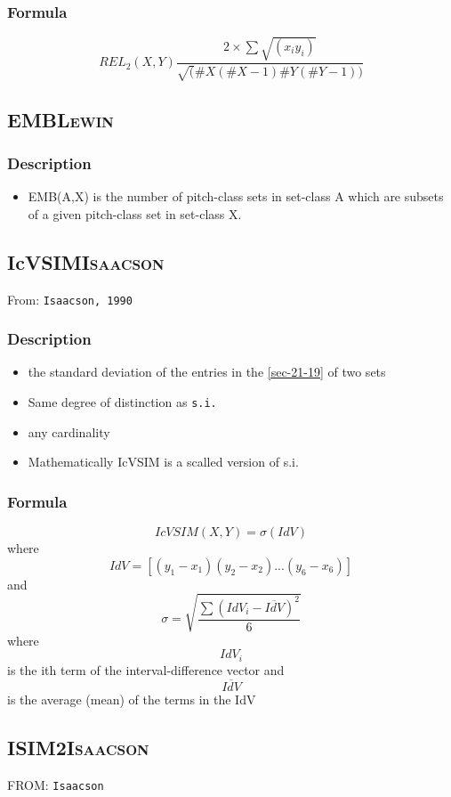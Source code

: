 \documentclass[11pt]{article}
\begin{document}
\subsubsection{Formula}
\label{sec-3-2-2}
$$ REL_{2}(X,Y) \frac{2\times \sum \sqrt{(x_{i}y_{i})}}{\sqrt(\#X(\#X-1)\#Y(\#Y-1))} $$

\subsection{EMB\hfill{}\textsc{Lewin}}
\label{sec-3-3}
\subsubsection{Description}
\label{sec-3-3-1}
\begin{itemize}
\item EMB(A,X) is the number of pitch-class sets in set-class A which
are subsets of a given pitch-class set in set-class X.
\end{itemize}
\subsection{IcVSIM\hfill{}\textsc{Isaacson}}
\label{sec-3-4}
From: \texttt{Isaacson, 1990}
\subsubsection{Description}
\label{sec-3-4-1}
\begin{itemize}
\item the standard deviation of the entries in the \ref{sec-21-19} of two sets
\item Same degree of distinction as \texttt{s.i.}
\item any cardinality
\item Mathematically IcVSIM is a scalled version of s.i.
\end{itemize}

\subsubsection{Formula}
\label{sec-3-4-2}
$$ IcVSIM\left(X,Y\right)=\sigma\left(IdV\right) $$
where 
$$ IdV=[(y_{1}-x_{1})(y_{2}-x_{2})...(y_{6}-x_{6})] $$
and
$$ \sigma =  \sqrt {\frac {\sum (IdV_{i}- \overline {IdV})^{2}}{6}} $$
where
$$IdV_{i}$$ is the ith term of the interval-difference vector and
$$\overline {IdV}$$ is the average (mean) of the terms in the IdV

\subsection{ISIM2\hfill{}\textsc{Isaacson}}
\label{sec-3-5}
FROM: \texttt{Isaacson}
\end{document}
